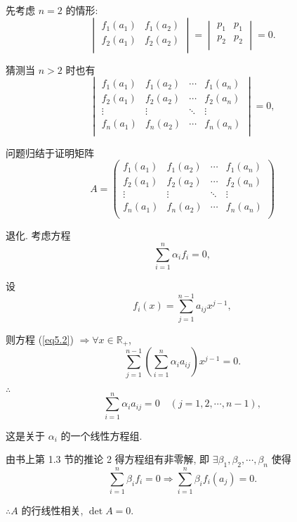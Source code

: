\documentclass[color=black,device=normal,lang=cn,mode=geye]{elegantnote}
\begin{document}
\begin{solution}
    先考虑 $n=2$ 的情形:
    \[\begin{vmatrix}
        f_1(a_1) & f_1(a_2) \\
        f_2(a_1) & f_2(a_2) \\
    \end{vmatrix}=\begin{vmatrix}
        p_1 & p_1 \\
        p_2 & p_2 \\
    \end{vmatrix}=0.\]

    猜测当 $n>2$ 时也有
    \[\begin{vmatrix}
        f_1(a_1) & f_1(a_2) & \cdots & f_1(a_n) \\
        f_2(a_1) & f_2(a_2) & \cdots & f_2(a_n) \\
        \vdots & \vdots & \ddots & \vdots \\
        f_n(a_1) & f_n(a_2) & \cdots & f_n(a_n) \\
    \end{vmatrix}=0,\]

    问题归结于证明矩阵
    \[A=\begin{pmatrix}
        f_1(a_1) & f_1(a_2) & \cdots & f_1(a_n) \\
        f_2(a_1) & f_2(a_2) & \cdots & f_2(a_n) \\
        \vdots & \vdots & \ddots & \vdots \\
        f_n(a_1) & f_n(a_2) & \cdots & f_n(a_n) \\
    \end{pmatrix}\]

    退化. 考虑方程
    \begin{equation}\label{eq5.2}
        \sum\limits_{i=1}^n\alpha_if_i=0,
    \end{equation}

    设
    \[f_i(x)=\sum\limits_{j=1}^{n-1}a_{ij}x^{j-1},\]

    则方程 (\ref{eq5.2}) $\Rightarrow\forall x\in\mathbb{R}_+$,
    \[\sum\limits_{j=1}^{n-1}\left(\sum\limits_{i=1}^n\alpha_ia_{ij}\right)x^{j-1}=0.\]

    $\therefore$
    \[\sum\limits_{i=1}^n\alpha_ia_{ij}=0\quad(j=1,2,\cdots,n-1),\]

    这是关于 $\alpha_i$ 的一个线性方程组.
    
    由书上第 1.3 节的推论 2 得方程组有非零解, 即 $\exists\beta_1,\beta_2,\cdots,\beta_n$ 使得
    \[\sum\limits_{i=1}^n\beta_if_i=0\Rightarrow\sum\limits_{i=1}^n\beta_if_i(a_j )=0.\]

    $\therefore A$ 的行线性相关, $\det A=0$.
\end{solution}
\end{document}
